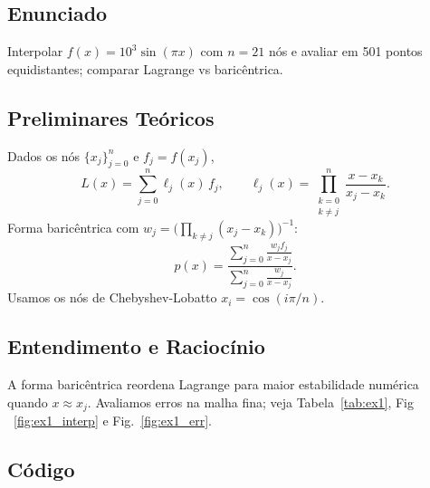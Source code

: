\documentclass[11pt,a4paper]{article}
\begin{document}
\subsection*{Enunciado}
Interpolar $f(x)=10^3\sin(\pi x)$ com $n=21$ nós e avaliar em 501 pontos equidistantes; comparar Lagrange vs baricêntrica.

\subsection*{Preliminares Teóricos}
Dados os nós $\{x_j\}_{j=0}^{n}$ e $f_j=f(x_j)$,
\begin{equation}
L(x)=\sum_{j=0}^n \ell_j(x)\,f_j,\qquad
\ell_j(x)=\prod_{\substack{k=0\\k\neq j}}^n \frac{x-x_k}{x_j-x_k}.
\end{equation}
Forma baricêntrica com $w_j=\big(\prod_{k\neq j}(x_j-x_k)\big)^{-1}$:
\begin{equation}
p(x)=\frac{\sum_{j=0}^{n}\frac{w_j f_j}{x-x_j}}{\sum_{j=0}^{n}\frac{w_j}{x-x_j}}.
\end{equation}
Usamos os nós de Chebyshev-Lobatto $x_i=\cos(i\pi/n)$.

\subsection*{Entendimento e Raciocínio}
A forma baricêntrica reordena Lagrange para maior estabilidade numérica quando $x\approx x_j$. Avaliamos erros na malha fina; veja Tabela~\ref{tab:ex1}, Fig ~\ref{fig:ex1_interp} e Fig.~\ref{fig:ex1_err}.

\subsection*{Código}

\end{document}
